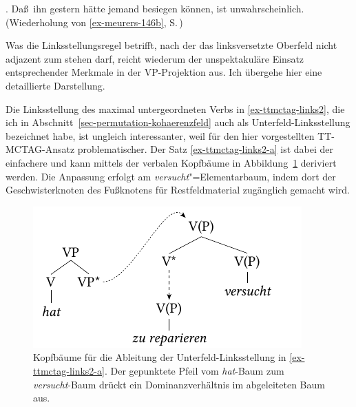 \ex. \label{ex-ttmctag-links3} Da\ss\ ihn gestern hätte jemand besiegen können, ist unwahrscheinlich. \\
(Wiederholung von \ref{ex-meurers-146b}, S.\,\pageref{ex-meurers-146b})

Was die Linksstellungsregel betrifft, nach der das linksversetzte Oberfeld nicht adjazent zum  stehen darf, reicht wiederum der unspektakuläre Einsatz entsprechender Merkmale in der VP-Projektion aus. Ich übergehe hier eine detaillierte Darstellung.

Die Linksstellung des maximal untergeordneten Verbs in \ref{ex-ttmctag-links2}, die ich in Abschnitt~\ref{sec-permutation-kohaerenzfeld} auch als Unterfeld-Linksstellung bezeichnet habe, ist ungleich interessanter, weil für den hier vorgestellten TT-MCTAG-Ansatz problematischer. Der Satz \ref{ex-ttmctag-links2-a} ist dabei der einfachere und kann mittels der verbalen Kopfbäume in Abbildung~\ref{fig-ttmctag-links2-1} deriviert werden. Die Anpassung erfolgt am {\it versucht}"=Elementarbaum, indem dort der Geschwisterknoten des Fu\ss knotens für Restfeldmaterial zugänglich gemacht wird.   
\begin{figure}[t]
\centering
\includegraphics{graphics/abb718.pdf}
\caption{\label{fig-ttmctag-links2-1}Kopfbäume für die Ableitung der Unterfeld-Linksstellung in \ref{ex-ttmctag-links2-a}. Der gepunktete Pfeil vom {\it hat}-Baum zum {\it versucht}-Baum drückt ein Dominanzverhältnis im abgeleiteten Baum aus.}
\end{figure}
